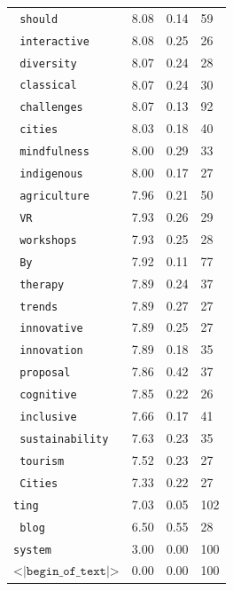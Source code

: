 \begin{table}[h!]
\begin{tabular}{llll}
\texttt{ should} & 8.08 & 0.14 & 59 \\
\texttt{ interactive} & 8.08 & 0.25 & 26 \\
\texttt{ diversity} & 8.07 & 0.24 & 28 \\
\texttt{ classical} & 8.07 & 0.24 & 30 \\
\texttt{ challenges} & 8.07 & 0.13 & 92 \\
\texttt{ cities} & 8.03 & 0.18 & 40 \\
\texttt{ mindfulness} & 8.00 & 0.29 & 33 \\
\texttt{ indigenous} & 8.00 & 0.17 & 27 \\
\texttt{ agriculture} & 7.96 & 0.21 & 50 \\
\texttt{ VR} & 7.93 & 0.26 & 29 \\
\texttt{ workshops} & 7.93 & 0.25 & 28 \\
\texttt{ By} & 7.92 & 0.11 & 77 \\
\texttt{ therapy} & 7.89 & 0.24 & 37 \\
\texttt{ trends} & 7.89 & 0.27 & 27 \\
\texttt{ innovative} & 7.89 & 0.25 & 27 \\
\texttt{ innovation} & 7.89 & 0.18 & 35 \\
\texttt{ proposal} & 7.86 & 0.42 & 37 \\
\texttt{ cognitive} & 7.85 & 0.22 & 26 \\
\texttt{ inclusive} & 7.66 & 0.17 & 41 \\
\texttt{ sustainability} & 7.63 & 0.23 & 35 \\
\texttt{ tourism} & 7.52 & 0.23 & 27 \\
\texttt{ Cities} & 7.33 & 0.22 & 27 \\
\texttt{ting} & 7.03 & 0.05 & 102 \\
\texttt{ blog} & 6.50 & 0.55 & 28 \\
\texttt{system} & 3.00 & 0.00 & 100 \\
\texttt{$\texttt{<|begin\_of\_text|>}$} & 0.00 & 0.00 & 100 \\
\bottomrule
\end{tabular}
\end{table}




